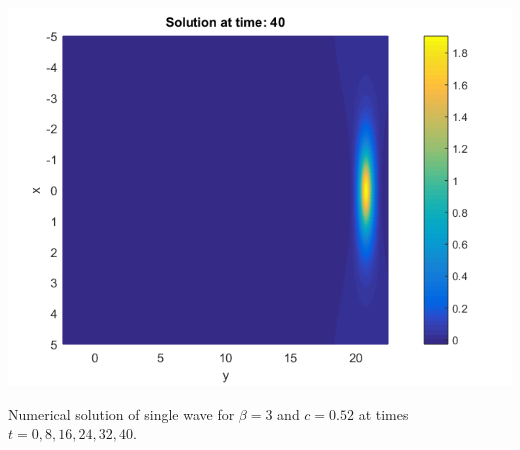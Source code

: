 \documentclass{beamer}
\begin{document}
\begin{frame}
\begin{center}
\begin{minipage}[b]{0.30\linewidth}
	\end{minipage}
	\begin{minipage}[b]{0.30\linewidth}
		 \includegraphics[width=\linewidth]{figures/Solution_bt3_t=40.png}
	\end{minipage}
\end{center}
Numerical solution of single wave for $\beta=3$ and $c = 0.52$ at times $t=0,8,16,24,32,40$.
\end{frame}

\end{document}
